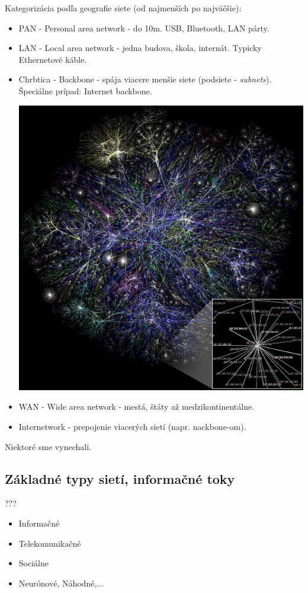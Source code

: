 \documentclass[10pt,a4paper]{article}
\begin{document}
Kategorizácia podľa geografie siete (od najmenších po najväčšie):
\begin{itemize}
\item PAN - Personal area network - do 10m. USB, Bluetooth, LAN párty.           
\item LAN - Local area network - jedna budova, škola, internát. Typicky Ethernetové káble.  
\item Chrbtica - Backbone - spája viacere menšie siete (podsiete - \emph{subnets}). Špeciálne prípad: Internet backbone.
\begin{center}
\includegraphics[scale=0.4]{backbone.jpg}
\end{center} 
\item WAN - Wide area network - mestá, štáty až medzikontinentálne. 
\item Internetwork - prepojenie viacerých sietí (napr. nackbone-om).
\end{itemize}
Niektoré sme vynechali. 

\subsection{Základné typy sietí, informačné toky}  
???
\begin{itemize}
\item Informačné 
\item Telekomunikačné
\item Sociálne
\item Neurónové, Náhodné,...            
\end{itemize}
\end{document}
